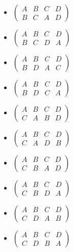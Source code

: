 \begin{enumerate}[{a.}]
\begin{multicols}{3}
\begin{itemize}
	\item
	$\begin{pmatrix}
	A & B & C & D\\
	B & C & A & D
	\end{pmatrix}$
	
	\item
	$\begin{pmatrix}
	A & B & C & D\\
	B & C & D & A
	\end{pmatrix}$
	
	\item
	$\begin{pmatrix}
	A & B & C & D\\
	B & D & A & C
	\end{pmatrix}$
	
	\item
	$\begin{pmatrix}
	A & B & C & D\\
	B & D & C & A
	\end{pmatrix}$
	
	\item
	$\begin{pmatrix}
	A & B & C & D\\
	C & A & B & D
	\end{pmatrix}$

	\item
	$\begin{pmatrix}
	A & B & C & D\\
	C & A & D & B
	\end{pmatrix}$
	
	\item
	$\begin{pmatrix}
	A & B & C & D\\
	C & B & A & D
	\end{pmatrix}$
	
	\item
	$\begin{pmatrix}
	A & B & C & D\\
	C & B & D & A
	\end{pmatrix}$
	
	\item
	$\begin{pmatrix}
	A & B & C & D\\
	C & D & A & B
	\end{pmatrix}$
	
	\item
	$\begin{pmatrix}
	A & B & C & D\\
	C & D & B & A
	\end{pmatrix}$
	

\end{itemize}
\end{multicols}
\end{enumerate}
